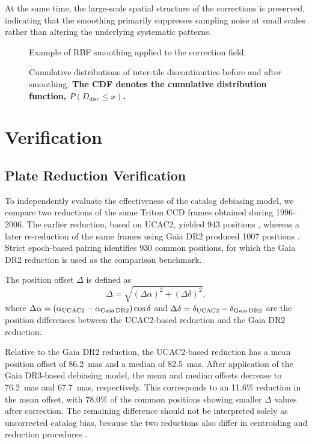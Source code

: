 \documentclass[linenumbers,amsmath,manuscript]{aastex702}
\begin{document}
At the same time, the large-scale spatial structure of the corrections is preserved, indicating that the smoothing primarily suppresses sampling noise at small scales rather than altering the underlying systematic patterns.

\begin{figure}[ht!]
\caption{Example of RBF smoothing applied to the correction field.}
\label{fig:bias_ucac4_zoom_compare_n256}
\end{figure}

\begin{figure}[ht!]
\caption{Cumulative distributions of inter-tile discontinuities before and after smoothing. \textbf{The CDF denotes the cumulative distribution function, $P(D_{\mathrm{disc}} \leq x)$.}}
\label{fig:bias_jump}
\end{figure}

\section{Verification} \label{sec:verification}

\subsection{Plate Reduction Verification}

To independently evaluate the effectiveness of the catalog debiasing model, we compare two reductions of the same Triton CCD frames obtained during 1996--2006. The earlier reduction, based on UCAC2, yielded 943 positions \citep{Qiao2007}, whereas a later re-reduction of the same frames using Gaia DR2 produced 1007 positions \citep{Yan2020}. Strict epoch-based pairing identifies 930 common positions, for which the Gaia DR2 reduction is used as the comparison benchmark.

The position offset $\Delta$ is defined as
\begin{equation}
\Delta = \sqrt{(\Delta\alpha)^2 + (\Delta\delta)^2},
\end{equation}
where $\Delta\alpha = (\alpha_{\rm UCAC2}-\alpha_{\rm Gaia\,DR2})\cos\delta$ and $\Delta\delta = \delta_{\rm UCAC2}-\delta_{\rm Gaia\,DR2}$ are the position differences between the UCAC2-based reduction and the Gaia DR2 reduction.

Relative to the Gaia DR2 reduction, the UCAC2-based reduction has a mean position offset of 86.2~mas and a median of 82.5~mas. After application of the Gaia DR3-based debiasing model, the mean and median offsets decrease to 76.2~mas and 67.7~mas, respectively. This corresponds to an 11.6\% reduction in the mean offset, with 78.0\% of the common positions showing smaller $\Delta$ values after correction. The remaining difference should not be interpreted solely as uncorrected catalog bias, because the two reductions also differ in centroiding and reduction procedures \citep{Yan2020}.
\end{document}
